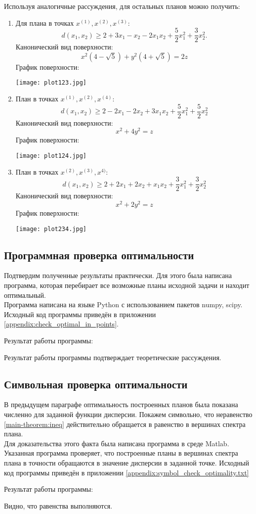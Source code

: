 Используя аналогичные рассуждения, для остальных планов можно получить:
\begin{enumerate}
	\item Для плана в точках $x^{(1)}, x^{(2)}, x^{(3)}$:
	$$d(x_1, x_2) \ge 2 + 3x_1 - x_2 -2x_1x_2 +\frac{5}{2}x_1^2 + \frac 3 2 x_2^2.$$
	Канонический вид поверхности:
	$$x^2 (4 - \sqrt{5}) + y^2 (4 + \sqrt 5) = 2z$$
	График поверхности:\\
	\begin{center}\texttt{[image: plot123.jpg]}\end{center}
	
	\item План в точках $x^{(1)}, x^{(2)}, x^{(4)}$:
	$$d(x_1, x_2) \ge 2 - 2x_1 - 2x_2 +3x_1x_2 +\frac{5}{2}x_1^2 + \frac 5 2 x_2^2$$
	Канонический вид поверхности:
	$$x^2 + 4y^2 = z$$
	График поверхности:\\
	\begin{center}\texttt{[image: plot124.jpg]}\end{center}
	\item План в точках $x^{(2)}, x^{(3)}, x^{4)}$:
	$$d(x_1, x_2) \ge 2 + 2x_1 + 2x_2 +x_1x_2 +\frac{3}{2}x_1^2 + \frac 3 2 x_2^2$$
	Канонический вид поверхности:
	$$x^2 + 2 y^2 = z$$
	График поверхности:\\
	\begin{center}\texttt{[image: plot234.jpg]}\end{center}
\end{enumerate}

\subsection{Программная проверка оптимальности}
Подтвердим полученные результаты практически. Для этого была написана программа, которая перебирает все возможные планы исходной задачи и находит оптимальный.\\
Программа написана на языке Python с использованием пакетов numpy, scipy.\\
Исходный код программы приведён в приложении \ref{appendix:check_optimal_in_points}.

Результат работы программы:


Результат работы программы подтверждает теоретические рассуждения.


\subsection {Символьная проверка оптимальности}
В предыдущем параграфе оптимальность построенных планов была показана численно для заданной функции дисперсии. Покажем символьно, что неравенство \eqref{main-theorem:ineq} действительно обращается в равенство в вершинах спектра плана.\\
Для доказательства этого факта была написана программа в среде Matlab.
Указанная программа проверяет, что построенные планы в вершинах спектра плана в точности обращаются в значение дисперсии в заданной точке. Исходный код программы приведён в приложении \ref{appendix:symbol_check_optimality.txt}

Результат работы программы:


Видно, что равенства выполняются.